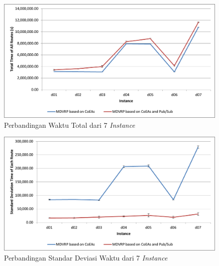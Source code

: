\begin{figure}[H]
	\centering
	\includegraphics[width=\textwidth]{Resources/Images/test_result_delay_total_time}
	\caption{Perbandingan Waktu Total dari 7 \textit{Instance}}
	\label{fig:test_result_delay_total_time}
\end{figure}


\begin{figure}[H]
	\centering
	\includegraphics[width=\textwidth]{Resources/Images/test_result_delay_standard_deviation}
	\caption{Perbandingan Standar Deviasi Waktu dari 7 \textit{Instance}}
	\label{fig:test_result_delay_standard_deviation}
\end{figure}




